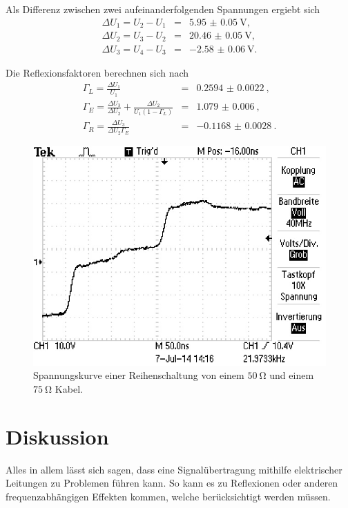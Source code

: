 Als Differenz zwischen zwei aufeinanderfolgenden Spannungen ergiebt sich
\begin{eqnarray}
	\Delta U_1 = U_2 - U_1 &=& \SI{5.95(5)}{\volt},\\
	\Delta U_2 = U_3 - U_2 &=& \SI{20.46(5)}{\volt},\\
	\Delta U_3 = U_4 - U_3 &=& \SI{-2.58(6)}{\volt}.
\end{eqnarray}

Die Reflexionsfaktoren berechnen sich nach
\begin{eqnarray}
	\Gamma_L = \frac{\Delta U_1}{U_1} &=& \SI{0.2594(22)}{},\\
	\Gamma_E = \frac{\Delta U_3}{\Delta U_2} + \frac{\Delta U_2}{U_1(1-\Gamma_L)} &=& \SI{1.079(6)}{},\\
	\Gamma_R = \frac{\Delta U_3}{\Delta U_2 \Gamma_E} &=& \SI{-0.1168(28)}{}.
\end{eqnarray}

\begin{figure}
	\centering
	\includegraphics[width = 12cm]{data/e/ALL0008/F0008TEK.JPG}
	\caption{Spannungskurve einer Reihenschaltung von einem $\SI{50}{\ohm}$ und einem $\SI{75}{\ohm}$ Kabel.}
	\label{fig_abs10}
\end{figure}

\FloatBarrier
\section{Diskussion} %
\label{sec:diskussion}

Alles in allem lässt sich sagen, dass eine Signalübertragung mithilfe elektrischer Leitungen zu Problemen führen kann. 
So kann es zu Reflexionen oder anderen frequenzabhängigen Effekten kommen, welche berücksichtigt werden müssen.

